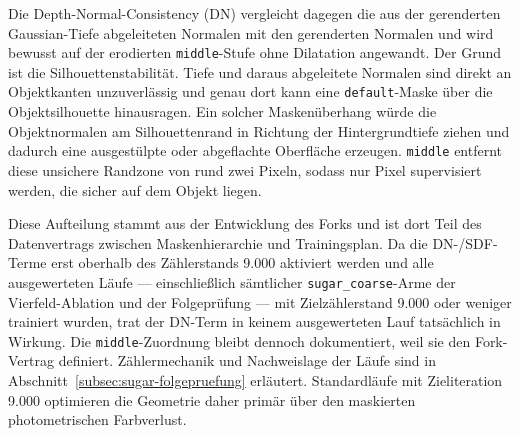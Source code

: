 Die Depth-Normal-Consistency (DN) vergleicht dagegen die aus der gerenderten
Gaussian-Tiefe abgeleiteten Normalen mit den gerenderten Normalen und wird
bewusst auf der erodierten \texttt{middle}-Stufe ohne Dilatation angewandt.
Der Grund ist die Silhouettenstabilität. Tiefe und daraus abgeleitete Normalen
sind direkt an Objektkanten unzuverlässig und genau dort kann eine
\texttt{default}-Maske über die Objektsilhouette hinausragen. Ein solcher
Maskenüberhang würde die Objektnormalen am Silhouettenrand in Richtung der
Hintergrundtiefe ziehen und dadurch eine ausgestülpte oder abgeflachte
Oberfläche erzeugen. \texttt{middle} entfernt diese unsichere Randzone von
rund zwei Pixeln, sodass nur Pixel supervisiert werden, die sicher auf dem
Objekt liegen.

Diese Aufteilung stammt aus der Entwicklung des Forks und ist dort Teil des
Datenvertrags zwischen Maskenhierarchie und Trainingsplan. Da die
DN-/SDF-Terme erst oberhalb des Zählerstands 9.000 aktiviert werden und alle
ausgewerteten Läufe — einschließlich sämtlicher \texttt{sugar\_coarse}-Arme
der Vierfeld-Ablation und der Folgeprüfung — mit Zielzählerstand 9.000 oder
weniger trainiert wurden, trat der DN-Term in keinem ausgewerteten Lauf
tatsächlich in Wirkung. Die \texttt{middle}-Zuordnung bleibt dennoch
dokumentiert, weil sie den Fork-Vertrag definiert. Zählermechanik und
Nachweislage der Läufe sind in Abschnitt~\ref{subsec:sugar-folgepruefung}
erläutert. Standardläufe mit Zieliteration 9.000 optimieren die Geometrie
daher primär über den maskierten photometrischen Farbverlust.


